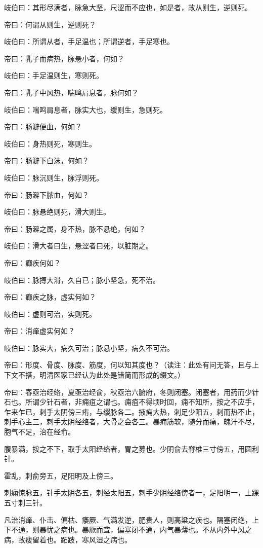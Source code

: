 \documentclass{article}%
\begin{document}
岐伯曰：其形尽满者，脉急大坚，尺涩而不应也，如是者，故从则生，逆则死。

帝曰：何谓从则生，逆则死？

岐伯曰：所谓从者，手足温也；所谓逆者，手足寒也。

帝曰：乳子而病热，脉悬小者，何如？

岐伯曰：手足温则生，寒则死。

帝曰：乳子中风热，喘鸣肩息者，脉何如？

岐伯曰：喘鸣肩息者，脉实大也，缓则生，急则死。

帝曰：肠澼便血，何如？

岐伯曰：身热则死，寒则生。

帝曰：肠澼下白沫，何如？

岐伯曰：脉沉则生，脉浮则死。

帝曰：肠澼下脓血，何如？

岐伯曰：脉悬绝则死，滑大则生。

帝曰：肠澼之属，身不热，脉不悬绝，何如？

岐伯曰：滑大者曰生，悬涩者曰死，以脏期之。

帝曰：癫疾何如？

岐伯曰：脉搏大滑，久自已；脉小坚急，死不治。

帝曰：癫疾之脉，虚实何如？

岐伯曰：虚则可治，实则死。

帝曰：消瘅虚实何如？

岐伯曰：脉实大，病久可治；脉悬小坚，病久不可治。

帝曰：形度、骨度、脉度、筋度，何以知其度也？（读注：此处有问无答，且与上下文不搭，明清医家已经认为此处是错简而形成的缀文。）

帝曰：春亟治经络，夏亟治经俞，秋亟治六腑府，冬则闭塞。闭塞者，用药而少针石也。所谓少针石者，非痈疽之谓也。痈疽不得顷时回，痈不知所，按之不应手，乍来乍已，刺手太阴傍三痏，与缨脉各二。掖痈大热，刺足少阳五，刺而热不止，刺手心主三，刺手太阴经络者，大骨之会各三。暴痈筋软，随分而痛，魄汗不尽，胞气不足，治在经俞。

腹暴满，按之不下，取手太阳经络者，胃之募也。少阴俞去脊椎三寸傍五，用圆利针。

霍乱，刺俞旁五，足阳明及上傍三。

刺痫惊脉五，针手太阴各五，刺经太阳五，刺手少阴经络傍者一，足阳明一，上踝五寸刺三针。

凡治消瘅、仆击、偏枯、痿厥、气满发逆，肥贵人，则高粱之疾也。隔塞闭绝，上下不通，则暴忧之病也。暴厥而聋，偏塞闭不通，内气暴薄也。不从内外中风之病，故瘦留着也。跖跛，寒风湿之病也。
\end{document}
